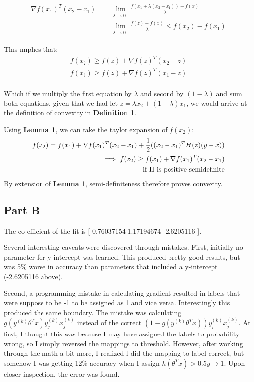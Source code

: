 \documentclass[11pt]{article}
\begin{document}
\begin{align}
	\begin{split}
		\nabla f(x_1)^T(x_2-x_1) &= \lim_{\lambda \rightarrow 0^+}\frac{f(x_1+\lambda(x_2-x_1))-f(x)}{\lambda} \\
		&= \lim_{\lambda \rightarrow 0^+}\frac{f(z)-f(x)}{\lambda} \leq f(x_2) - f(x_1)
	\end{split}
\end{align}

This implies that:
\begin{align}
	f(x_2) \geq f(z) + \nabla f(z)^T(x_2-z) \\
	f(x_1) \geq f(z) + \nabla f(z)^T(x_1-z) \\
\end{align}

Which if we multiply the first equation by $\lambda$ and second by $(1-\lambda)$ and sum both equations, 
given that we had let $z=\lambda x_2 + (1-\lambda)x_1$,  we would arrive at the definition of convexity in
\textbf{Definition 1}.

Using \textbf{Lemma 1}, we can take the taylor expansion of $f(x_2)$:
\begin{align}
	\begin{split}
	f(x_2) = f(x_1) + \nabla f(x_1)^T(x_2-x_1) + \frac{1}{2}((x_2-x_1)^TH(z)(y-x)) \\
	\implies f(x_2) \geq f(x_1) + \nabla f(x_1)^T(x_2-x_1) \\ 
	\textnormal{if H is positive semidefinite}
	\end{split}
\end{align}
By extension of \textbf{Lemma 1}, semi-definiteness therefore proves convexity. 


\subsection*{Part B}

The co-efficient of the fit is [ 0.76037154  1.17194674 -2.6205116 ].

Several interesting caveats were discovered through mistakes. First, initially no parameter for
y-intercept was learned. This produced pretty good results, but was 5\% worse in accuracy than
parameters that included a y-intercept (-2.6205116 above). 

Second, a programming mistake in calculating gradient resulted in labels that were suppose to be
{-1} to be assigned as {1} and vice versa. Interestingly this produced the same boundary. The
mistake was calculating $g(y^{(k)}\theta^Tx)y_j^{(k)}x_j^{(k)}$ instead of the correct  
$(1-g(y^{(k)}\theta^Tx))y_j^{(k)}x_j^{(k)}$. At first, I thought this was because I may have 
assigned the labels to probability wrong, so I simply reversed the mappings to threshold. 
However, after working through the math a bit more, I realized I did the mapping to label 
correct, but somehow I was getting 12\% accuracy when I assign $h(\theta^Tx)>0.5 y\rightarrow1$.
Upon closer inspection, the error was found.
\end{document}
